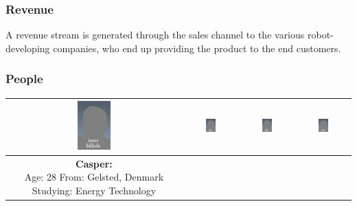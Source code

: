 \subsubsection{Revenue}
A revenue stream is generated through the sales channel to the various robot-developing companies, who end up providing the product to the end customers.   

\subsubsection{People}

\begin{table}[h]
\centering
\begin{tabular}{|c|c|c|c|}
\hline
\includegraphics[width=0.2\textwidth]{graphics/AnonProfile} & %
\includegraphics[width=0.2\textwidth]{graphics/AnonProfile} & %
\includegraphics[width=0.2\textwidth]{graphics/AnonProfile} & %
\includegraphics[width=0.2\textwidth]{graphics/AnonProfile} \\ \hline %
\parbox[t] {0.2\textwidth}{
\textbf{Casper:} \\
Age: 28
From: Gelsted, Denmark
Studying: Energy Technology
} 


\end{tabular}
\end{table}
